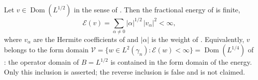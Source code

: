 \begin{lemma}
Let $v \in \operatorname{Dom}(L^{1/2})$ in the sense of .
Then the fractional energy of  is finite,
\[
  \mathcal{E}(v) = \sum_{\alpha \neq 0} |\alpha|^{1/2}\,|v_\alpha|^2 < \infty ,
\]
where $v_\alpha$ are the Hermite coefficients of  and
$|\alpha|$ is the weight of .  Equivalently, $v$ belongs
to the form domain
$\mathcal{V} = \{w \in L^2(\gamma_n) : \mathcal{E}(w) < \infty\}
 = \operatorname{Dom}(L^{1/4})$ of : the operator domain of
$B = L^{1/2}$ is contained in the form domain of the energy.  Only this
inclusion is asserted; the reverse inclusion is false and is not claimed.
\end{lemma}

